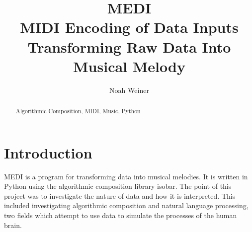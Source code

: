 \documentclass[runningheads,a4paper]{llncs}
\newcommand{\keywords}[1]{\par\addvspace\baselineskip
\noindent\keywordname\enspace\ignorespaces#1}
\begin{document}
\mainmatter  %

\title{MEDI\\
MIDI Encoding of Data Inputs\\
Transforming Raw Data Into Musical Melody}


%
%
\author{Noah Weiner}
%


%
%

\maketitle


\begin{abstract}
\keywords{Algorithmic Composition, MIDI, Music, Python}
\end{abstract}


\section{Introduction}

MEDI is a program for transforming data into musical melodies. It is written in
Python using the algorithmic composition library isobar. The point of this
project was to investigate the nature of data and how it is interpreted. This
included investigating algorithmic composition and natural language processing,
two fields which attempt to use data to simulate the processes of the human
brain.
\end{document}
